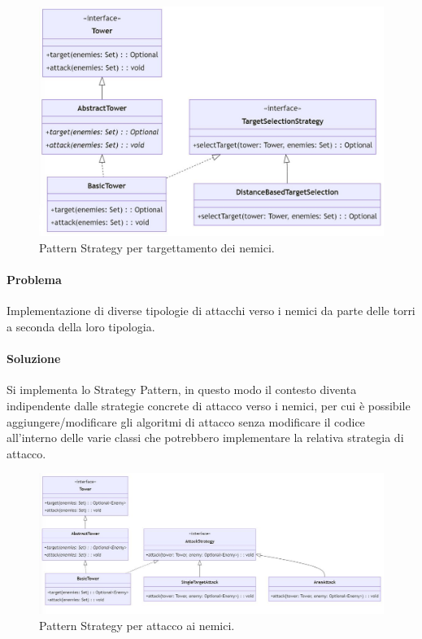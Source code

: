 \documentclass[a4paper,12pt]{report}
\begin{document}
\begin{figure}[H]
    \centering
    \includegraphics[width=0.8\linewidth]{defense_target}
    \caption{Pattern Strategy per targettamento dei nemici.}
    \label{fig:defense_target}
\end{figure}

\vspace{70mm}

\paragraph{Problema}
Implementazione di diverse tipologie di attacchi verso i nemici da parte delle torri a seconda della loro tipologia.
\paragraph{Soluzione}
Si implementa lo Strategy Pattern, in questo modo il contesto diventa indipendente dalle strategie concrete di attacco verso i nemici, per cui è possibile aggiungere/modificare gli algoritmi di attacco senza modificare il codice all'interno delle varie classi che potrebbero implementare la relativa strategia di attacco.

\begin{figure}[H]
    \centering
    \includegraphics[width=0.8\linewidth]{defense_attack}
    \caption{Pattern Strategy per attacco ai nemici.}
    \label{fig:defense_attack}
\end{figure}
\end{document}
